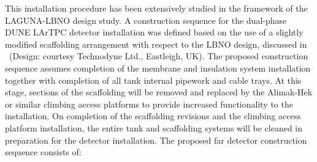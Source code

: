 This installation procedure has been extensively studied in the
framework of the LAGUNA-LBNO design study. A construction sequence for
the dual-phase DUNE LArTPC detector installation was defined based on
the use of a slightly modified scaffolding arrangement with respect to
the LBNO design, discussed in \anxlbnob\ (Design: courtesy Technodyne
Ltd., Eastleigh, UK). The proposed construction sequence assumes
completion of the membrane and insulation system installation together
with completion of all tank internal pipework and cable trays.  At
this stage, sections of the scaffolding will be removed and replaced
by the Alimak-Hek or similar climbing access platforms to provide
increased functionality to the installation.  On completion of the
scaffolding revisions and the climbing access platform installation,
the entire tank and scaffolding systems will be cleaned in preparation
for the detector installation. The proposed far detector construction
sequence consists of:
